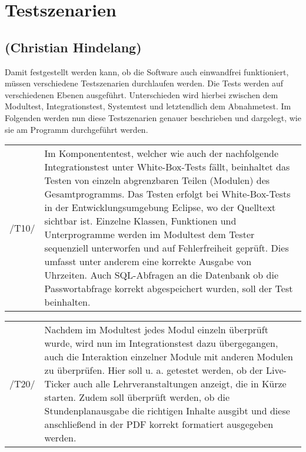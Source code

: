 \section{Testszenarien}
\label{sec:Testszenarien}

\subsection*{(Christian Hindelang)}

Damit festgestellt werden kann, ob die Software auch einwandfrei funktioniert, müssen verschiedene Testszenarien durchlaufen werden.
Die Tests werden auf verschiedenen Ebenen ausgeführt. Unterschieden wird hierbei zwischen dem Modultest, Integrationstest, Systemtest und letztendlich dem Abnahmetest.
Im Folgenden werden nun diese Testszenarien genauer beschrieben und dargelegt, wie sie am Programm durchgeführt werden.\\

\begin{tabular}{p{1.5cm}p{14.5cm}}
 /T10/	& Im Komponententest, welcher wie auch der nachfolgende Integrationstest unter White-Box-Tests fällt, beinhaltet das Testen von einzeln abgrenzbaren Teilen (Modulen) des Gesamtprogramms. Das Testen erfolgt bei White-Box-Tests in der Entwicklungsumgebung Eclipse, wo der Quelltext sichtbar ist. Einzelne Klassen, Funktionen und Unterprogramme werden im Modultest dem Tester sequenziell unterworfen und auf Fehlerfreiheit geprüft. Dies umfasst unter anderem eine korrekte Ausgabe von Uhrzeiten. Auch SQL-Abfragen an die Datenbank ob die Passwortabfrage korrekt abgespeichert wurden, soll der Test beinhalten. \\[0.25cm]	 
\end{tabular}

\begin{tabular}{p{1.5cm}p{14.5cm}}
 /T20/	& Nachdem im Modultest jedes Modul einzeln überprüft wurde, wird nun im Integrationstest dazu übergegangen, auch die Interaktion einzelner Module mit anderen Modulen zu überprüfen.
Hier soll u. a. getestet werden, ob der Live-Ticker auch alle Lehrveranstaltungen anzeigt, die in Kürze starten. Zudem soll überprüft werden, ob die Stundenplanausgabe die richtigen Inhalte ausgibt und diese anschließend in der PDF korrekt formatiert ausgegeben werden. \\[0.25cm]	 
\end{tabular}

